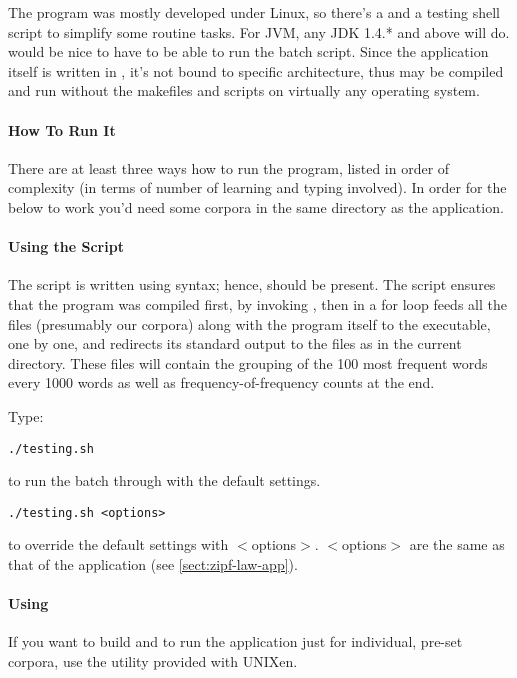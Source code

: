 The program was mostly developed under Linux, so there's
a  and a testing shell script to simplify some routine tasks.
For JVM, any JDK 1.4.* and above will do.  would be nice
to have to be able to run the batch script. Since the application
itself is written in {\java}, it's not bound to specific architecture,
thus may be compiled and run without the makefiles and scripts
on virtually any operating system.

\paragraph{How To Run It}

There are at least three ways how to run the program, listed in order of complexity
(in terms of number of learning and typing involved).
In order for the below to work you'd need some corpora in
the same directory as the application.

\paragraph{Using the  Script}

The script is written using  syntax; hence,  should be
present. The script ensures
that the program was compiled first, by invoking , then
in a for loop feeds all the  files (presumably our corpora) along with the 
program itself to the executable, one by one, and redirects its standard output
to the files as  in the current directory. These files will contain the
grouping of the 100 most frequent words every 1000 words as well as frequency-of-frequency counts at the end.

\noindent
Type:

\verb+./testing.sh+

\noindent
to run the batch through with the default settings.

\verb+./testing.sh <options>+

\noindent
to override the default settings with $<$options$>$. $<$options$>$ are the same
as that of the  application (see \ref{sect:zipf-law-app}).

\paragraph{Using }

If you want to build and to run the application just for individual,
pre-set corpora, use the  utility provided with UNIXen.

